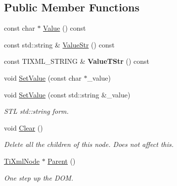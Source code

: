 \subsection*{Public Member Functions}
\begin{DoxyCompactItemize}
\item 
const char $\ast$ \hyperlink{class_ti_xml_node_ad44dfe927d49a74dd78b72b7514417ad}{Value} () const
\item 
const std\+::string \& \hyperlink{class_ti_xml_node_a74bda074919e4a5e08d700204793f898}{Value\+Str} () const
\item 
\hypertarget{class_ti_xml_node_a74c4ea4a91c0a91900c919f69f657d6a}{}\label{class_ti_xml_node_a74c4ea4a91c0a91900c919f69f657d6a} 
const T\+I\+X\+M\+L\+\_\+\+S\+T\+R\+I\+NG \& {\bfseries Value\+T\+Str} () const
\item 
void \hyperlink{class_ti_xml_node_a2a38329ca5d3f28f98ce932b8299ae90}{Set\+Value} (const char $\ast$\+\_\+value)
\item 
\hypertarget{class_ti_xml_node_a2598d5f448042c1abbeae4503dd45ff2}{}\label{class_ti_xml_node_a2598d5f448042c1abbeae4503dd45ff2} 
void \hyperlink{class_ti_xml_node_a2598d5f448042c1abbeae4503dd45ff2}{Set\+Value} (const std\+::string \&\+\_\+value)
\begin{DoxyCompactList}\small\item\em S\+TL std\+::string form. \end{DoxyCompactList}\item 
\hypertarget{class_ti_xml_node_a708e7f953df61d4d2d12f73171550a4b}{}\label{class_ti_xml_node_a708e7f953df61d4d2d12f73171550a4b} 
void \hyperlink{class_ti_xml_node_a708e7f953df61d4d2d12f73171550a4b}{Clear} ()
\begin{DoxyCompactList}\small\item\em Delete all the children of this node. Does not affect \textquotesingle{}this\textquotesingle{}. \end{DoxyCompactList}\item 
\hypertarget{class_ti_xml_node_ab643043132ffd794f8602685d34a982e}{}\label{class_ti_xml_node_ab643043132ffd794f8602685d34a982e} 
\hyperlink{class_ti_xml_node}{Ti\+Xml\+Node} $\ast$ \hyperlink{class_ti_xml_node_ab643043132ffd794f8602685d34a982e}{Parent} ()
\begin{DoxyCompactList}\small\item\em One step up the D\+OM. \end{DoxyCompactList}\item 
\hypertarget{class_ti_xml_node_af13df38878a5798142693d01d6133ba0}{}\label{class_ti_xml_node_af13df38878a5798142693d01d6133ba0} 

\end{DoxyCompactItemize}
